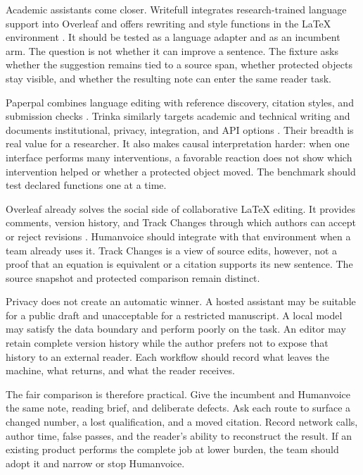 \hvFigureAlternativeUnits

\Needspace{13cm}
Academic assistants come closer. Writefull integrates research-trained language
support into Overleaf and offers rewriting and style functions in the LaTeX
environment \citep{writefull2026overleaf}. It should be tested as a language
adapter and as an incumbent arm. The question is not whether it can improve a
sentence. The fixture asks whether the suggestion remains tied to a source
span, whether protected objects stay visible, and whether the resulting note
can enter the same reader task.

Paperpal combines language editing with reference discovery, citation styles,
and submission checks \citep{paperpal2026assistant}. Trinka similarly targets
academic and technical writing and documents institutional, privacy,
integration, and API options \citep{trinka2026privacy}. Their breadth is real
value for a researcher. It also makes causal interpretation harder: when one
interface performs many interventions, a favorable reaction does not show
which intervention helped or whether a protected object moved. The benchmark
should test declared functions one at a time.

Overleaf already solves the social side of collaborative LaTeX editing. It
provides comments, version history, and Track Changes through which authors can
accept or reject revisions \citep{overleaf2026trackchanges}. Humanvoice should
integrate with that environment when a team already uses it. Track Changes is a
view of source edits, however, not a proof that an equation is equivalent or a
citation supports its new sentence. The source snapshot and protected
comparison remain distinct.

Privacy does not create an automatic winner. A hosted assistant may be suitable
for a public draft and unacceptable for a restricted manuscript. A local model
may satisfy the data boundary and perform poorly on the task. An editor may
retain complete version history while the author prefers not to expose that
history to an external reader. Each workflow should record what leaves the
machine, what returns, and what the reader receives.

The fair comparison is therefore practical. Give the incumbent and Humanvoice
the same note, reading brief, and deliberate defects. Ask each route to surface
a changed number, a lost qualification, and a moved citation. Record network
calls, author time, false passes, and the reader's ability to reconstruct the
result. If an existing product performs the complete job at lower burden, the
team should adopt it and narrow or stop Humanvoice.

